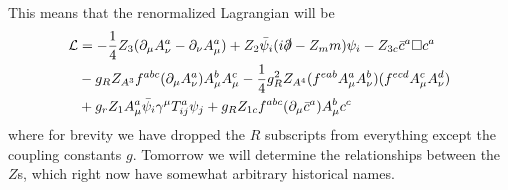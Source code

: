 This means that the renormalized Lagrangian will be
\begin{align*}
\mathcal L &= -\frac{1}{4}Z_3 (\partial_\mu A_\nu^a - \partial_\nu A_\mu^a) + Z_2 \bar \psi_i(i \slashed \partial - Z_m m) \psi_i - Z_{3c} \bar c^a \square c^a \\
&- g_R Z_{A^3} f^{abc} (\partial_\mu A_\nu^a) A_\mu^b A_\mu^c - \frac{1}{4} g_R^2 Z_{A^4} (f^{eab} A^a_\mu A^b_\nu)(f^{ecd} A_\mu^c A_\nu^d)\\
&+g_r Z_1 A_\mu^a \bar \psi_i \gamma^\mu T_{ij}^a \psi_j + g_R Z_{1c} f^{abc} (\partial_\mu \bar c^a)A_\mu^b c^c
\end{align*}
where for brevity we have dropped the $R$ subscripts from everything except the coupling constants $g$.
Tomorrow we will determine the relationships between the $Z$s, which right now have somewhat arbitrary historical names.